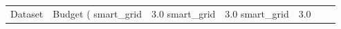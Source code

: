 \begin{tabular}{llrlrrr}
\toprule
Dataset & Budget (%
\midrule
smart_grid & 3.0%
smart_grid & 3.0%
smart_grid & 3.0%
\bottomrule
\end{tabular}
